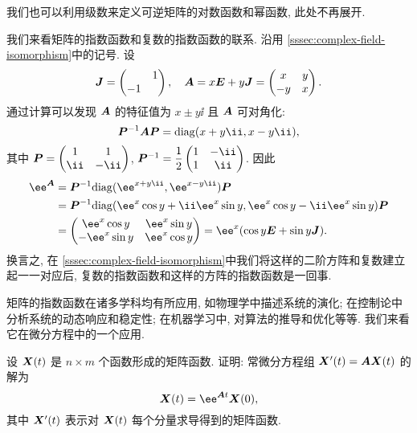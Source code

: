 我们也可以利用级数来定义可逆矩阵的对数函数和幂函数, 此处不再展开.

我们来看矩阵的指数函数和复数的指数函数的联系.
沿用 \ref{sssec:complex-field-isomorphism}中的记号.
设
\[
  {\boldsymbol{J}}=\begin{pmatrix}
    &1\\-1&
  \end{pmatrix},\quad
  {\boldsymbol{A}}=x{\boldsymbol{E}}+y{\boldsymbol{J}}=\begin{pmatrix}
    x&y\\-y&x
  \end{pmatrix}.
\]
通过计算可以发现 ${\boldsymbol{A}}$ 的特征值为 $x\pm y\ii$ 且 ${\boldsymbol{A}}$ 可对角化:
\[
  \bfP^{-1}\bfA\bfP=\diag(x+y\ii,x-y\ii), 
\]
其中 $\bfP=\begin{pmatrix}
  1&1\\\ii&-\ii
\end{pmatrix}$, $\bfP^{-1}=\dfrac12\begin{pmatrix}
  1&-\ii\\1&\ii
\end{pmatrix}$.
因此
\begin{align*}
  \ee^\bfA&
  =\bfP^{-1}\diag(\ee^{x+y\ii},\ee^{x-y\ii})\bfP\\&
  =\bfP^{-1}\diag(\ee^x\cos y+\ii\ee^x\sin y,
    \ee^x\cos y-\ii\ee^x\sin y)\bfP\\&
  =\begin{pmatrix}
    \ee^x\cos y&\ee^x\sin y\\
    -\ee^x\sin y&\ee^x\cos y
  \end{pmatrix}
  =\ee^x(\cos y\bfE+\sin y \bfJ).
\end{align*}
换言之, 在 \ref{sssec:complex-field-isomorphism}中我们将这样的二阶方阵和复数建立起一一对应后, 复数的指数函数和这样的方阵的指数函数是一回事.

矩阵的指数函数在诸多学科均有所应用, 如物理学中描述系统的演化; 在控制论中分析系统的动态响应和稳定性; 在机器学习中, 对算法的推导和优化等等.
我们来看它在微分方程中的一个应用.

\begin{example}
  \label{exam:matrix-exponential-derivative}
  设 ${\boldsymbol{X}}(t)$ 是 $n\times m$ 个函数形成的矩阵函数.
  证明: 常微分方程组 ${\boldsymbol{X}}'(t)={\boldsymbol{A}}{\boldsymbol{X}}(t)$ 的解为 
  \[
    \bfX(t)=\ee^{\bfA t}\bfX(0),
  \]
  其中 ${\boldsymbol{X}}'(t)$ 表示对 ${\boldsymbol{X}}(t)$ 每个分量求导得到的矩阵函数.
\end{example}

